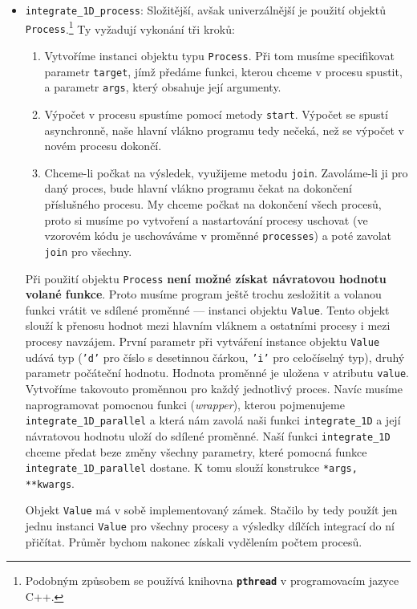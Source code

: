 \documentclass[a4paper,11pt,twoside]{article}
\def\code#1{\textnormal{\texttt{#1}}}
\def\file#1{\textnormal{\textbf{\texttt{#1}}}}
\theoremstyle{red}
\theoremstyle{green}
\begin{document}
\begin{itemize}
        \item \code{integrate_1D_process}:
            Složitější, avšak univerzálnější je použití objektů \code{Process}.\footnote{
                Podobným způsobem se používá knihovna \file{pthread} v programovacím jazyce C++.
            }
            Ty vyžadují vykonání tři kroků:
            \begin{enumerate}
                \item 
                    Vytvoříme instanci objektu typu \code{Process}.
                    Při tom musíme specifikovat parametr \code{target}, jímž předáme funkci, kterou chceme v procesu spustit, a parametr \code{args}, který obsahuje její argumenty.
                \item
                    Výpočet v procesu spustíme pomocí metody \code{start}.
                    Výpočet se spustí asynchronně, naše hlavní vlákno programu tedy nečeká, než se výpočet v novém procesu dokončí.
                \item
                    Chceme-li počkat na výsledek, využijeme metodu \code{join}.
                    Zavoláme-li ji pro daný proces, bude hlavní vlákno programu čekat na dokončení příslušného procesu.
                    My chceme počkat na dokončení všech procesů, proto si musíme po vytvoření a nastartování procesy uschovat (ve vzorovém kódu je uschováváme v proměnné \code{processes}) a poté zavolat \code{join} pro všechny.
            \end{enumerate}

            Při použití objektu \code{Process} {\bf není možné získat návratovou hodnotu volané funkce}.
            Proto musíme program ještě trochu zesložitit a volanou funkci vrátit ve sdílené proměnné --- instanci objektu \code{Value}.
            Tento objekt slouží k přenosu hodnot mezi hlavním vláknem a ostatními procesy i mezi procesy navzájem.
            První parametr při vytváření instance objektu \code{Value} udává typ (\code{'d'} pro číslo s desetinnou čárkou, \code{'i'} pro celočíselný typ), druhý parametr počáteční hodnotu.
            Hodnota proměnné je uložena v atributu \code{value}.
            Vytvoříme takovouto proměnnou pro každý jednotlivý proces.
            Navíc musíme naprogramovat pomocnou funkci (\emph{wrapper}), kterou pojmenujeme \code{integrate_1D_parallel}  a která nám zavolá naši funkci \code{integrate_1D} a její návratovou hodnotu uloží do sdílené proměnné.
            Naší funkci \code{integrate_1D} chceme předat beze změny všechny parametry, které pomocná funkce \code{integrate_1D_parallel} dostane.
            K tomu slouží konstrukce \code{*args, **kwargs}.
            
            Objekt \code{Value} má v sobě implementovaný zámek.
            Stačilo by tedy použít jen jednu instanci \code{Value} pro všechny procesy a výsledky dílčích integrací do ní přičítat.
            Průměr bychom nakonec získali vydělením počtem procesů.
    \end{itemize}
\end{document}
